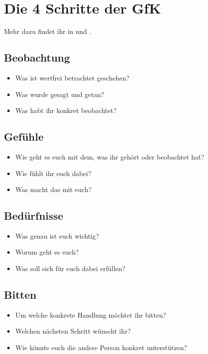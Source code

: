 \section{Die 4 Schritte der GfK}
\label{gfk-schritte}

Mehr dazu findet ihr in \cite[S.~213]{gfk-rosenberg} und \cite{gfk-dummies}.

\subsection{Beobachtung}

\begin{itemize}
 \item Was ist wertfrei betrachtet geschehen?
 \item Was wurde gesagt und getan?
 \item Was habt ihr konkret beobachtet?
\end{itemize}


\subsection{Gefühle}

\begin{itemize}
 \item Wie geht es euch mit dem, was ihr gehört oder beobachtet hat?
 \item Wie fühlt ihr euch dabei?
 \item Was macht das mit euch?
\end{itemize}


\subsection{Bedürfnisse}

\begin{itemize}
 \item Was genau ist euch wichtig?
 \item Worum geht es euch?
 \item Was soll sich für euch dabei erfüllen?
\end{itemize}


\subsection{Bitten}

\begin{itemize}
 \item Um welche konkrete Handlung möchtet ihr bitten?
 \item Welchen nächsten Schritt wünscht ihr?
 \item Wie könnte euch die andere Person konkret unterstützen?
\end{itemize}
